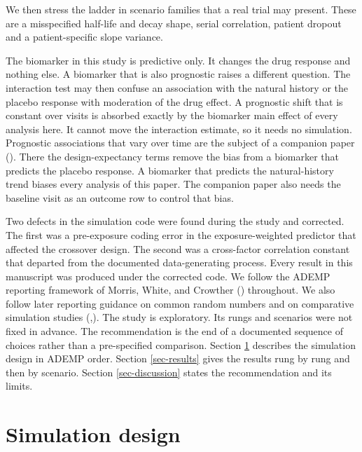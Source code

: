 \documentclass[
  11pt,
]{article}
\begin{document}
We then stress the ladder in scenario families that a real trial may
present. These are a misspecified half-life and decay shape, serial
correlation, patient dropout and a patient-specific slope variance.

The biomarker in this study is predictive only. It changes the drug
response and nothing else. A biomarker that is also prognostic raises
a different question. The interaction test may then confuse an
association with the natural history or the placebo response with
moderation of the drug effect. A prognostic shift that is constant
over visits is absorbed exactly by the biomarker main effect of every
analysis here. It cannot move the interaction estimate, so it needs no
simulation. Prognostic associations that vary over time are the
subject of a companion paper (). There the
design-expectancy terms remove the bias from a biomarker that predicts
the placebo response. A biomarker that predicts the natural-history
trend biases every analysis of this paper. The companion paper also
needs the baseline visit as an outcome row to control that bias.

Two defects in the simulation code were found during the study and
corrected. The first was a pre-exposure coding error in the
exposure-weighted predictor that affected the crossover design. The
second was a cross-factor correlation constant that departed from the
documented data-generating process. Every result in this manuscript
was produced under the corrected code. We follow the ADEMP reporting
framework of Morris, White, and Crowther
() throughout. We also follow later reporting
guidance on common random numbers and on comparative simulation
studies (,). The study is exploratory. Its rungs
and scenarios were not fixed in advance. The recommendation is the end
of a documented sequence of choices rather than a pre-specified
comparison. Section \ref{sec-design} describes the simulation design
in ADEMP order. Section \ref{sec-results} gives the results rung by
rung and then by scenario. Section \ref{sec-discussion} states the
recommendation and its limits.

\section{Simulation design}\label{sec-design}
\end{document}
